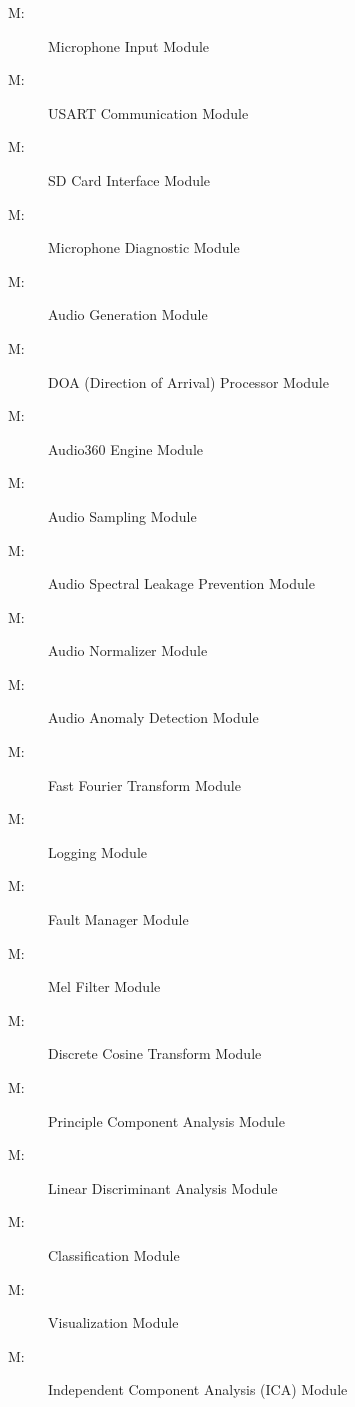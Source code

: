 \documentclass[12pt, titlepage]{article}
\newcounter{mnum}
\newcommand{\mthemnum}{M\themnum}
\begin{document}
\begin{description}
\item [ \mthemnum \label{mMicInput}:] Microphone Input
  Module
\item [ \mthemnum \label{mUSART}:] USART Communication
  Module
\item [ \mthemnum \label{mSDInterface}:] SD Card Interface
  Module
\item [ \mthemnum \label{mMicDiag}:] Microphone Diagnostic
  Module 
\item [ \mthemnum \label{mAudioGen}:] Audio Generation
  Module
\item [ \mthemnum \label{mDOA}:] DOA (Direction of Arrival)
  Processor Module
\item [ \mthemnum \label{mAudio360Engine}:] Audio360 Engine
  Module
\item [ \mthemnum \label{mAudioSampling}:] Audio Sampling
  Module
\item [ \mthemnum \label{mAudioSpectralLeakage}:] Audio
  Spectral Leakage Prevention Module
\item [ \mthemnum \label{mAudioNormalizer}:] Audio
  Normalizer Module
\item [ \mthemnum \label{mAudioAnomaly}:] Audio Anomaly
  Detection Module
\item [ \mthemnum \label{mFFT}:] Fast Fourier Transform
  Module 
\item [ \mthemnum \label{mLogging}:] Logging Module
\item [ \mthemnum \label{mFaultManager}:] Fault Manager
  Module 
\item [ \mthemnum \label{mMelFilter}:] Mel Filter Module
\item [ \mthemnum \label{mDCT}:] Discrete Cosine Transform
Module
\item [ \mthemnum \label{mPCA}:] Principle Component
Analysis Module
\item [ \mthemnum \label{mLDA}:] Linear Discriminant
Analysis Module
\item [ \mthemnum \label{mClassification}:] Classification
  Module
\item [ \mthemnum \label{mVisualization}:] Visualization
  Module
\item [ \mthemnum \label{mICA}:] Independent Component
  Analysis (ICA) Module
\end{description}
\end{document}
